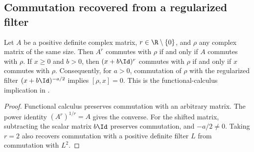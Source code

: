 \subsection{Commutation recovered from a regularized filter}
\label{sec:shifted_density_commutation}

\begin{theorem}
    \label{thm:shifted_density_commutation}
    \leanok
    Let $A$ be a positive definite complex matrix, $r\in\R\setminus\{0\}$,
    and $\rho$ any complex matrix of the same size. Then $A^r$ commutes with
    $\rho$ if and only if $A$ commutes with $\rho$.
    If $x\ge0$ and $b>0$, then $(x+b\Id)^r$ commutes with $\rho$ if and only
    if $x$ commutes with $\rho$. Consequently, for $a>0$, commutation of $\rho$ with the
    regularized filter $(x+b\Id)^{-a/2}$ implies $[\rho,x]=0$.
    This is the functional-calculus implication in
    \cite[Section~4, descending stationarity]{OpenAI2026PolynomialPEPS}.
\end{theorem}
\begin{proof}
    \leanok
    Functional calculus preserves commutation with an arbitrary matrix.
    The power identity $(A^r)^{1/r}=A$ gives the converse.
    For the shifted matrix, subtracting the scalar matrix $b\Id$ preserves
    commutation, and $-a/2\ne0$. Taking $r=2$ also recovers commutation
    with a positive definite filter $L$ from commutation with $L^2$.
\end{proof}
